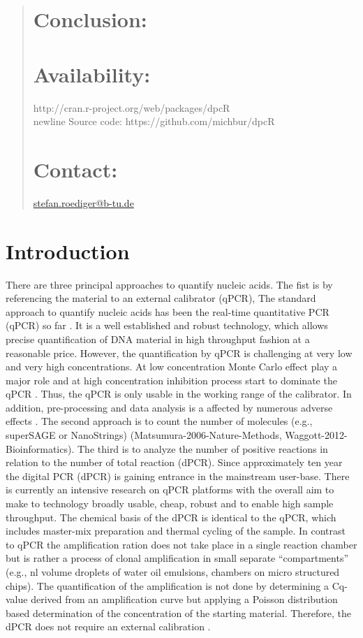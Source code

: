 \documentclass{bioinfo}
\begin{document}
\begin{abstract}
\section{Conclusion:}

\section{Availability:}
http://cran.r-project.org/web/packages/dpcR\\newline
Source code: https://github.com/michbur/dpcR\

\section{Contact:} \href{stefan.roediger@b-tu.de}{stefan.roediger@b-tu.de}
\end{abstract}

\section{Introduction}
There are three principal approaches to quantify nucleic acids. The fist is by 
referencing the material to an external calibrator (qPCR), The standard approach 
to quantify nucleic acids has been the real-time quantitative PCR (qPCR) so far 
\cite{pabinger_survey_2014}. It is a well established and robust technology, 
which allows precise quantification of DNA material in high throughput fashion 
at a reasonable price. However, the quantification by qPCR is challenging at 
very low and very high concentrations. At low concentration Monte Carlo effect 
play a major role and at high concentration inhibition process start to dominate 
the qPCR . Thus, the qPCR is only usable in the working range of the calibrator. 
In addition, pre-processing and data analysis is a affected by numerous adverse 
effects \cite{spiess_impact_2015}. The second approach is to count the number of 
molecules (e.g., superSAGE or NanoStrings) (Matsumura-2006-Nature-Methods, 
Waggott-2012-Bioinformatics). The third is to analyze the number of positive 
reactions in relation to the number of total reaction (dPCR). Since 
approximately ten year the digital PCR (dPCR) is gaining entrance in the 
mainstream user-base. There is currently an intensive research on qPCR platforms 
with the overall aim to make to technology broadly usable, cheap, robust and to 
enable high sample throughput. The chemical basis of the dPCR is identical to 
the qPCR, which includes master-mix preparation and thermal cycling of the 
sample. In contrast to qPCR the amplification ration does not take place in a 
single reaction chamber but is rather a process of clonal amplification in small 
separate ``compartments'' (e.g., nl volume droplets of water oil emulsions, 
chambers on micro structured chips). The quantification of the amplification is 
not done by determining a Cq-value derived from an amplification curve but 
applying a Poisson distribution based determination of the concentration of the 
starting material. Therefore, the dPCR does not require an external calibration 
\cite{selck_increased_2013, rodiger_r_2015}.
\end{document}
